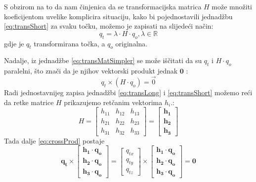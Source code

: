 S obzirom na to da nam činjenica da se transformacijska matrica $H$ može množiti koeficijentom uvelike komplicira situaciju, kako bi pojednostavili jednadžbu \eqref{eq:transShort} za svaku točku, možemo je zapisati na slijedeći način:
\begin{equation}
q_t = \lambda \cdot H \cdot q_o, \lambda \in \mathbb{R}
\label{eq:transMatSimpler}
\end{equation}
gdje je $q_t$ transformirana točka, a $q_o$ originalna.

Nadalje, iz jednadžbe \eqref{eq:transMatSimpler} se može iščitati da su $q_t$ i $H \cdot q_o$ paralelni, što znači da je njihov vektorski produkt jednak $\mathbf{0}$ \citep{vecParallel}:
\begin{equation}
\label{eq:crossProd}
q_t \times (H \cdot q_o) = \vec{0}
\end{equation}
Radi jednostavnijeg zapisa jednadžbi \eqref{eq:transLong} i \eqref{eq:transShort} možemo reći da retke matrice $H$ prikazujemo retčanim vektorima $h_i$.:
\begin{equation}
H = \left[
\begin{matrix}
h_{11} & h_{12} & h_{13} \\
h_{21} & h_{22} & h_{23} \\
h_{31} & h_{32} & h_{33}
\end{matrix}
\right]
= \left[
\begin{matrix}
\mathbf {h_1} \\
\mathbf{h_2} \\
\mathbf{h_3}
\end{matrix}
\right]
\end{equation}
Tada dalje \eqref{eq:crossProd} postaje
\begin{equation}
\label{eq:transCrossProdLong}
\mathbf{q_t} \times \left[
\begin{matrix}
\mathbf {h_1} \cdot \mathbf{q_o} \\
\mathbf{h_2} \cdot \mathbf{q_o} \\
\mathbf{h_3} \cdot \mathbf{q_o}
\end{matrix}
\right]
= \left[
\begin{matrix}
q_{tx} \\
q_{ty} \\
q_{tz}
\end{matrix}
\right]
\times \left[
\begin{matrix}
\mathbf {h_1} \cdot \mathbf{q_o} \\
\mathbf{h_2} \cdot \mathbf{q_o} \\
\mathbf{h_3} \cdot \mathbf{q_o}
\end{matrix}
\right]
= \mathbf{0}
\end{equation}

